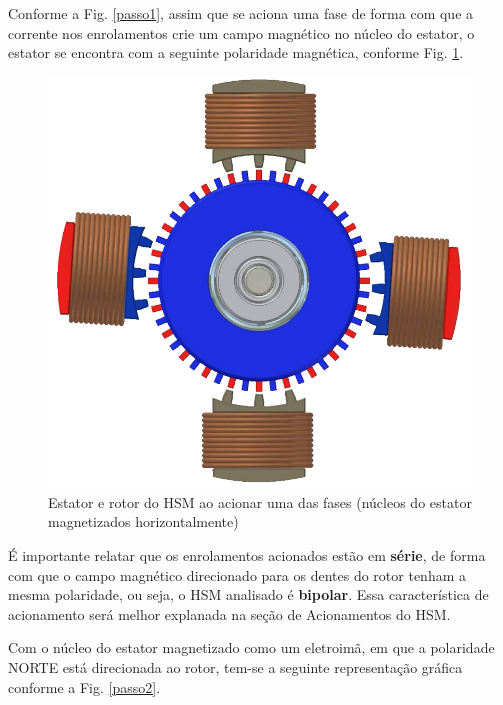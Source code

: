 	Conforme a Fig. \ref{passo1}, assim que se aciona uma fase de forma com que a corrente nos enrolamentos crie um campo magnético no núcleo do estator, o estator se encontra com a seguinte polaridade magnética, conforme Fig. \ref{acionamento1}.
	
	\begin{figure}[H]
		\centering 
		\includegraphics[scale=0.3]{images/hsm_operation/etapa3}
		\caption{Estator e rotor do HSM ao acionar uma das fases (núcleos do estator magnetizados horizontalmente)}
		\label{acionamento1}
	\end{figure}
	
	É importante relatar que os enrolamentos acionados estão em \textbf{série}, de forma com que o campo magnético direcionado para os dentes do rotor tenham a mesma polaridade, ou seja, o HSM analisado é \textbf{bipolar}. Essa característica de acionamento será melhor explanada na seção de Acionamentos do HSM.
	
	Com o núcleo do estator magnetizado como um eletroimã, em que a polaridade NORTE está direcionada ao rotor, tem-se a seguinte representação gráfica conforme a Fig. \ref{passo2}.
	
